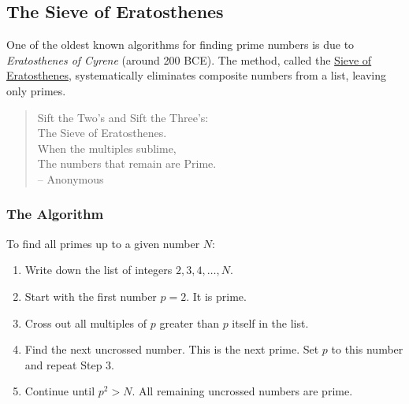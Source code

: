 \subsection{The Sieve of Eratosthenes}

One of the oldest known algorithms for finding prime numbers is due to 
\emph{Eratosthenes of Cyrene} (around 200 BCE). 
The method, called the \href{https://en.wikipedia.org/wiki/Sieve\_of\_Eratosthenes}{Sieve of Eratosthenes}, systematically eliminates 
composite numbers from a list, leaving only primes.

\begin{quote}
Sift the Two's and Sift the Three's: \\
The Sieve of Eratosthenes. \\
When the multiples sublime, \\
The numbers that remain are Prime. \\

\hspace{1.0in}	-- Anonymous
\end{quote}

\subsubsection*{The Algorithm}
To find all primes up to a given number $N$:

\begin{enumerate}
\item Write down the list of integers $2,3,4,\dots,N$.
\item Start with the first number $p=2$. It is prime.
\item Cross out all multiples of $p$ greater than $p$ itself in the list.
\item Find the next uncrossed number. This is the next prime. Set $p$ to this number and repeat Step 3.
\item Continue until $p^2 > N$. All remaining uncrossed numbers are prime.
\end{enumerate}

